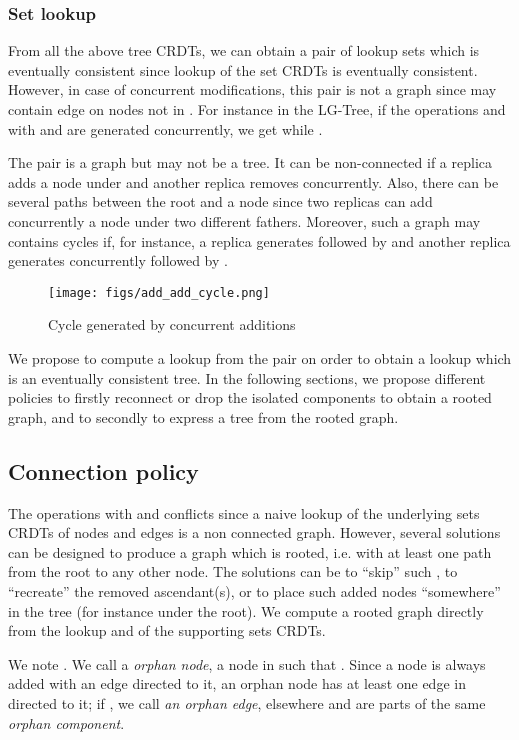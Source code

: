 \documentclass[a4paper]{article}
\begin{document}
\subsubsection{Set lookup}

From all the above tree CRDTs, we can obtain  a pair of
lookup sets which is eventually consistent since lookup of the set
CRDTs is eventually consistent. However, in case of concurrent
modifications, this pair  is not a graph since  may
contain edge on nodes not in . For instance in the LG-Tree, if
the operations  and  with  and
 are generated concurrently, we get  while .

The pair  is a graph but may not be
a tree. It can be non-connected if a replica adds a node under  and
another replica removes  concurrently. Also, there can be several
paths between the root and a node since two replicas can add
concurrently a node under two different fathers. Moreover, such a
graph may contains cycles if, for instance, a replica generates
 followed by  and another replica generates
concurrently  followed by .

\begin{figure}[H] 
\centering
\texttt{[image: figs/add\_add\_cycle.png]} 
\caption{Cycle generated by concurrent additions}
\label{fig:cycles} 
\end{figure} 

We propose to compute a lookup from the pair  on order to
obtain a lookup which is an eventually consistent tree. In the
following sections, we propose different policies to firstly reconnect
or drop the isolated components to obtain a rooted graph, and to
secondly to express a tree from the rooted graph.

\subsection{Connection policy}
\label{glue}

The operations  with  and 
conflicts since a naive lookup of the underlying sets CRDTs of nodes and
edges is a non connected graph.  However, several solutions can be
designed to produce a graph which is rooted, i.e. with at least one
path from the root to any other node. The solutions can be to ``skip''
such , to ``recreate'' the removed ascendant(s), or to place such
added nodes ``somewhere'' in the tree (for instance under the
root). We compute a rooted graph  directly from the
lookup  and  of the supporting sets CRDTs.

We note . We call a {\em orphan node},
a node  in  such that . Since a node
is always added with an edge directed to it, an orphan node  has at
least one edge in  directed to it; if , we
call  {\em an orphan edge}, elsewhere  and  are parts of
the same {\em orphan component}.
\end{document}
